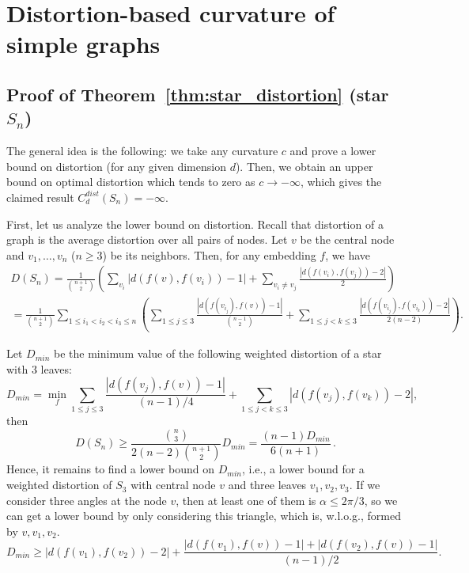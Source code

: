\documentclass{article} %
\begin{document}
\section{Distortion-based curvature of simple graphs}

\subsection{Proof of Theorem~\ref{thm:star_distortion} (star $S_n$)}\label{app:star_distortion}

The general idea is the following: we take any curvature $c$ and prove a lower bound on distortion (for any given dimension $d$). Then, we obtain an upper bound on optimal distortion which tends to zero as $c \to -\infty$, which gives the claimed result $C_d^{dist}(S_n) = -\infty$.

First, let us analyze the lower bound on distortion. Recall that distortion of a graph is the average distortion over all pairs of nodes. Let $v$ be the central node and $v_1, \ldots, v_n$ ($n \ge 3$) be its neighbors. Then, for any embedding $f$, we have
\begin{multline*}
D(S_n) = \frac{1}{\binom{n+1}{2}} \left( \sum_{v_i} {|d(f(v),f(v_i)) - 1|} + \sum_{v_i \neq v_j} \frac{|d(f(v_i),f(v_j)) - 2|}{2} \right) \\
= \frac{1}{\binom{n+1}{2}} \sum_{1 \le i_1 < i_2 < i_3 \le n} \left(
\sum_{1\le j \le 3}  \frac{|d(f(v_{i_j}),f(v)) - 1|}{{n-1 \choose 2}} +
\sum_{1\le j < k\le 3}  \frac{|d(f(v_{i_j}),f(v_{i_k})) - 2|}{2(n-2)}   \right).
\end{multline*}

Let $D_{min}$ be the minimum value of the following weighted distortion of a star with 3 leaves:
\[
D_{min} = \min_{f} \sum_{1\le j \le 3}  \frac{|d(f(v_j),f(v)) - 1|}{(n-1)/4} +
\sum_{1\le j < k\le 3}  |d(f(v_j),f(v_k)) - 2|,
\]
then 
\begin{equation}\label{eq:D_min}
D(S_n) \ge \frac{{n\choose 3}}{2(n-2){n+1 \choose 2}} D_{min} = \frac{ (n-1)D_{min}}{6(n+1)}\,.
\end{equation}
Hence, it remains to find a lower bound on $D_{min}$, i.e., a lower bound for a weighted distortion of $S_3$ with central node $v$ and three leaves $v_1, v_2, v_3$.
If we consider three angles at the node $v$, then at least one of them is $\alpha \le 2 \pi / 3$, so we can get a lower bound by only considering this triangle, which is, w.l.o.g., formed by $v, v_1, v_2$.
\[
D_{min} \ge  |d(f(v_1),f(v_2)) - 2| + \frac{|d(f(v_1),f(v)) - 1| + |d(f(v_2),f(v)) - 1|}{(n-1)/2}.
\]
\end{document}
